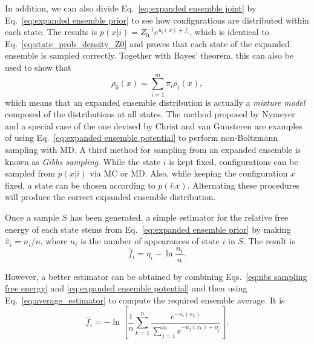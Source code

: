 \documentclass[aip,jcp,reprint,amsmath,amssymb]{revtex4-1}
\begin{document}
In addition, we can also divide Eq.~\eqref{eq:expanded ensemble joint} by Eq.~\eqref{eq:expanded ensemble prior} to see how configurations are distributed within each state. The results is $p(x|i) = Z_0^{-1} e^{u_i(x) + f_i}$, which is identical to Eq.~\eqref{eq:state_prob_density_Z0} and proves that each state of the expanded ensemble is sampled correctly. Together with Bayes' theorem, this can also be used to show that
\begin{equation}
\rho_0(x) = \sum_{i=1}^m \pi_i \rho_i(x),
\end{equation}
which means that an expanded ensemble distribution is actually a \textit{mixture model}\cite{Lindsay_1995, Marin_2005} composed of the distributions at all states. The method proposed by Nymeyer\cite{Nymeyer_2010} and a special case of the one devised by Christ and van Gunsteren\cite{Christ_2007, *Christ_2008, *Christ_2009} are examples of using Eq.~\eqref{eq:expanded ensemble potential} to perform non-Boltzmann sampling with MD. A third method for sampling from an expanded ensemble is known as \textit{Gibbs sampling}.\cite{Marin_2005, Chodera_2011} While the state $i$ is kept fixed, configurations can be sampled from $p(x|i)$ via MC or MD. Also, while keeping the configuration $x$ fixed, a state can be chosen according to $p(i|x)$. Alternating these procedures will produce the correct expanded ensemble distribution.\cite{Chodera_2011}

Once a sample $S$ has been generated, a simple estimator for the relative free energy of each state stems from Eq.~\eqref{eq:expanded ensemble prior} by making $\hat \pi_i = n_i/n$, where $n_i$ is the number of appearances of state $i$ in $S$. The result is
\begin{equation}
\hat f_i = \eta_i - \ln \frac{n_i}{n}.
\end{equation}

However, a better estimator can be obtained by combining Eqs.~\eqref{eq:nbs sampling free energy} and \eqref{eq:expanded ensemble potential} and then using Eq.~\eqref{eq:average_estimator} to compute the required ensemble average. It is
\begin{equation}
\hat f_i = -\ln \left[ \frac{1}{n}\sum_{k=1}^n \frac{e^{-u_i(x_k)}}{\sum_{j=1}^m e^{-u_j(x_k) + \eta_j}} \right].
\end{equation}
\end{document}
